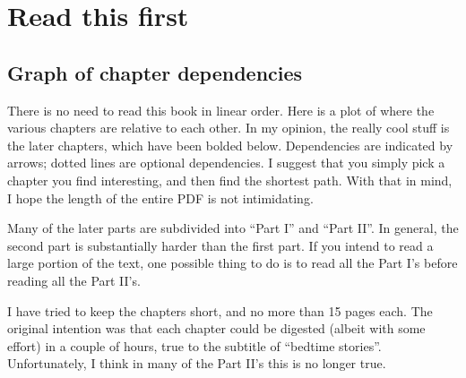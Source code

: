 \addtocounter{chapter}{-1}
\chapter{Read this first}
\section{Graph of chapter dependencies}
There is no need to read this book in linear order.
Here is a plot of where the various chapters are relative to each other.
In my opinion, the really cool stuff is the later chapters,
which have been bolded below.
Dependencies are indicated by arrows;
dotted lines are optional dependencies.
I suggest that you simply pick a chapter you find interesting,
and then find the shortest path.
With that in mind, I hope the length of the entire PDF is not intimidating.

Many of the later parts are subdivided into ``Part I'' and ``Part II''.
In general, the second part is substantially harder than the first part.
If you intend to read a large portion of the text,
one possible thing to do is to read all the Part I's
before reading all the Part II's.

I have tried to keep the chapters short, and no more than 15 pages each.
The original intention was that each chapter could be digested
(albeit with some effort) in a couple of hours,
true to the subtitle of ``bedtime stories''.
Unfortunately, I think in many of the Part II's this is no longer true.



\eject

